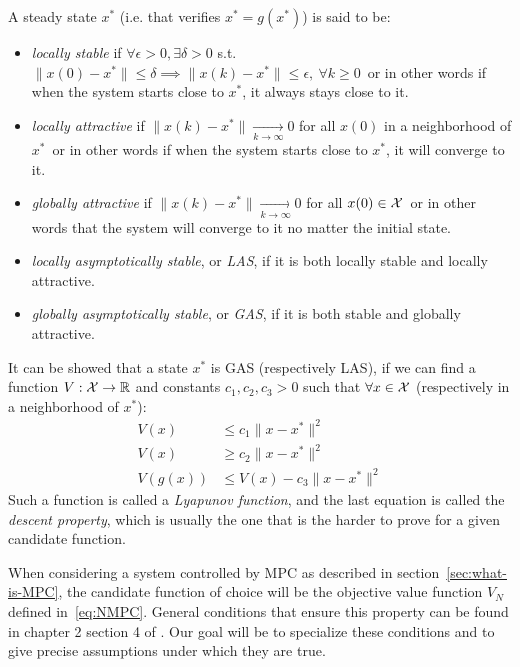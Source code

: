 \documentclass[12pt]{article}
\begin{document}
\noindent A steady state $x^*$ (i.e. that verifies $x^*=g(x^*)$) is said to be:
\begin{itemize}[label=\textbullet]
	\item \textit{locally stable} if $\forall\epsilon>0,\exists \delta>0$ s.t. $\|x(0)-x^*\|\leq\delta\implies\|x(k)-x^*\|\leq\epsilon,~\forall k\geq 0$\, or in other words if when the system starts close to $x^*$, it always stays close to it.
	\item \textit{locally attractive} if $\|x(k)-x^*\|\underset{k\to\infty}{\longrightarrow}0$ for all $x(0)$ in a neighborhood of $x^*$\, or in other words if when the system starts close to $x^*$, it will converge to it.
	\item \textit{globally attractive} if $\|x(k)-x^*\|\underset{k\to\infty}{\longrightarrow}0$ for all $x(0)\in\cal{X}$\, or in other words that the system will converge to it no matter the initial state.
	\item \textit{locally asymptotically stable}, or \textit{LAS}, if it is both locally stable and locally attractive.
	\item \textit{globally asymptotically stable}, or \textit{GAS}, if it is both stable and globally attractive.
\end{itemize}

It can be showed that a state $x^*$ is GAS (respectively LAS), if we can find a function $V:\cal{X}\to\R$ and constants $c_1,c_2,c_3>0$ such that $\forall x\in\cal{X}$ (respectively in a neighborhood of $x^*$):
\begin{align*}
	V(x)&\leq c_1\|x-x^*\|^2\\
	V(x)&\geq c_2\|x-x^*\|^2\\
	V(g(x))&\leq V(x)-c_3\|x-x^*\|^2
\end{align*}
Such a function is called a \textit{Lyapunov function}, and the last equation is called the \textit{descent property}, which is usually the one that is the harder to prove for a given candidate function.

\vspace{12pt}

When considering a system controlled by MPC as described in section~\ref{sec:what-is-MPC}, the candidate function of choice will be the objective value function $V_N$ defined in~\ref{eq:NMPC}.
General conditions that ensure this property can be found in chapter 2 section 4 of \cite{MPC-book}.
Our goal will be to specialize these conditions and to give precise assumptions under which they are true.
\end{document}
